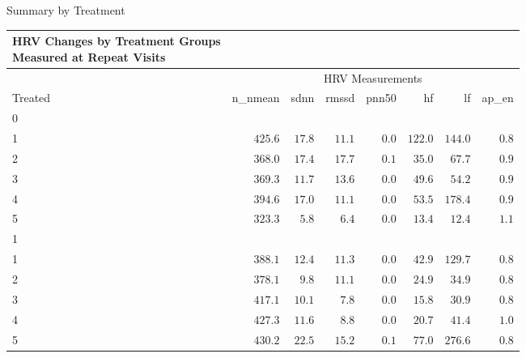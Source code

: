 \documentclass[
  ignorenonframetext,
  unknownkeysallowed]{beamer}
\begin{document}
\begin{frame}{Summary by Treatment}
\protect\hypertarget{summary-by-treatment}{}

\captionsetup[table]{labelformat=empty,skip=1pt}
\begin{longtable}{lrrrrrrr}
\caption*{
\large HRV Changes by Treatment Groups\\ 
\small Measured at Repeat Visits\\ 
} \\ 
\toprule
& \multicolumn{7}{c}{HRV Measurements} \\ 
 \cmidrule(lr){2-8}
Treated & n\_nmean & sdnn & rmssd & pnn50 & hf & lf & ap\_en \\ 
\midrule
\multicolumn{1}{l}{0} \\ 
\midrule
1 & $425.6$ & $17.8$ & $11.1$ & $0.0$ & $122.0$ & $144.0$ & $0.8$ \\ 
2 & $368.0$ & $17.4$ & $17.7$ & $0.1$ & $35.0$ & $67.7$ & $0.9$ \\ 
3 & $369.3$ & $11.7$ & $13.6$ & $0.0$ & $49.6$ & $54.2$ & $0.9$ \\ 
4 & $394.6$ & $17.0$ & $11.1$ & $0.0$ & $53.5$ & $178.4$ & $0.9$ \\ 
5 & $323.3$ & $5.8$ & $6.4$ & $0.0$ & $13.4$ & $12.4$ & $1.1$ \\ 
\midrule
\multicolumn{1}{l}{1} \\ 
\midrule
1 & $388.1$ & $12.4$ & $11.3$ & $0.0$ & $42.9$ & $129.7$ & $0.8$ \\ 
2 & $378.1$ & $9.8$ & $11.1$ & $0.0$ & $24.9$ & $34.9$ & $0.8$ \\ 
3 & $417.1$ & $10.1$ & $7.8$ & $0.0$ & $15.8$ & $30.9$ & $0.8$ \\ 
4 & $427.3$ & $11.6$ & $8.8$ & $0.0$ & $20.7$ & $41.4$ & $1.0$ \\ 
5 & $430.2$ & $22.5$ & $15.2$ & $0.1$ & $77.0$ & $276.6$ & $0.8$ \\ 
\bottomrule
\end{longtable}

\end{frame}
\end{document}
